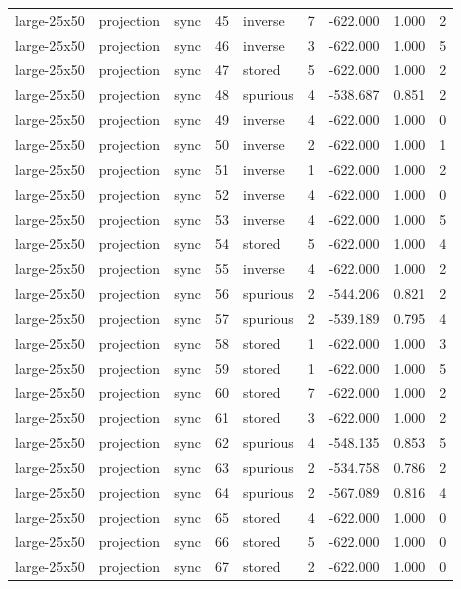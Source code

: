\begin{tabular}{lllrlrrrr}
large-25x50 & projection & sync & 45 & inverse & 7 & -622.000 & 1.000 & 2 \\
large-25x50 & projection & sync & 46 & inverse & 3 & -622.000 & 1.000 & 5 \\
large-25x50 & projection & sync & 47 & stored & 5 & -622.000 & 1.000 & 2 \\
large-25x50 & projection & sync & 48 & spurious & 4 & -538.687 & 0.851 & 2 \\
large-25x50 & projection & sync & 49 & inverse & 4 & -622.000 & 1.000 & 0 \\
large-25x50 & projection & sync & 50 & inverse & 2 & -622.000 & 1.000 & 1 \\
large-25x50 & projection & sync & 51 & inverse & 1 & -622.000 & 1.000 & 2 \\
large-25x50 & projection & sync & 52 & inverse & 4 & -622.000 & 1.000 & 0 \\
large-25x50 & projection & sync & 53 & inverse & 4 & -622.000 & 1.000 & 5 \\
large-25x50 & projection & sync & 54 & stored & 5 & -622.000 & 1.000 & 4 \\
large-25x50 & projection & sync & 55 & inverse & 4 & -622.000 & 1.000 & 2 \\
large-25x50 & projection & sync & 56 & spurious & 2 & -544.206 & 0.821 & 2 \\
large-25x50 & projection & sync & 57 & spurious & 2 & -539.189 & 0.795 & 4 \\
large-25x50 & projection & sync & 58 & stored & 1 & -622.000 & 1.000 & 3 \\
large-25x50 & projection & sync & 59 & stored & 1 & -622.000 & 1.000 & 5 \\
large-25x50 & projection & sync & 60 & stored & 7 & -622.000 & 1.000 & 2 \\
large-25x50 & projection & sync & 61 & stored & 3 & -622.000 & 1.000 & 2 \\
large-25x50 & projection & sync & 62 & spurious & 4 & -548.135 & 0.853 & 5 \\
large-25x50 & projection & sync & 63 & spurious & 2 & -534.758 & 0.786 & 2 \\
large-25x50 & projection & sync & 64 & spurious & 2 & -567.089 & 0.816 & 4 \\
large-25x50 & projection & sync & 65 & stored & 4 & -622.000 & 1.000 & 0 \\
large-25x50 & projection & sync & 66 & stored & 5 & -622.000 & 1.000 & 0 \\
large-25x50 & projection & sync & 67 & stored & 2 & -622.000 & 1.000 & 0 \\

\end{tabular}
